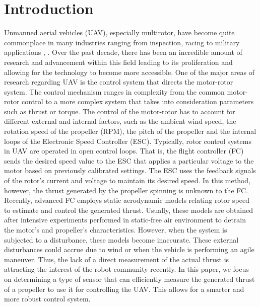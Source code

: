 \documentclass[conference]{IEEEtran}
\begin{document}
\section{Introduction}
Unmanned aerial vehicles (UAV), especially multirotor, have become quite commonplace in many industries ranging from inspection, racing to military applications \cite{bara}, \cite{Mathe}. Over the past decade, there has been an incredible amount of research and advancement within this field leading to its proliferation and allowing for the technology to become more accessible. One of the major areas of research regarding UAV is the control system that directs the motor-rotor system. The control mechanism ranges in complexity from the common motor-rotor control to a more complex system that takes into consideration parameters such as thrust or torque. The control of the motor-rotor has to account for different external and internal factors, such as the ambient wind speed, the rotation speed of the propeller (RPM), the pitch of the propeller and the internal loops of the Electronic Speed Controller (ESC). Typically, rotor control systems in UAV are operated in open control loops. That is, the flight controller (FC) sends the desired speed value to the ESC that applies a particular voltage to the motor based on previously calibrated settings. The ESC uses the feedback signals of the rotor’s current and voltage to maintain its desired speed. In this method, however, the thrust generated by the propeller spinning is unknown to the FC. Recently, advanced FC employs static aerodynamic models relating rotor speed to estimate and control the generated thrust. Usually, these models are obtained after intensive experiments performed in static-free air environment to detrain the motor’s and propeller’s characteristics. However, when the system is subjected to a disturbance, these models become inaccurate. These external disturbances could accrue due to wind or when the vehicle is performing an agile maneuver. Thus, the lack of a direct measurement of the actual thrust is attracting the interest of the robot community recently. In this paper, we focus on determining a type of sensor that can efficiently measure the generated thrust of a propeller to use it for controlling the UAV. This allows for a smarter and more robust control system.
\end{document}
